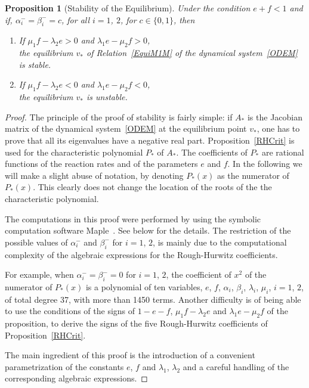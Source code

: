 \documentclass[english]{amsart}
\newtheorem{proposition}{Proposition}
\numberwithin{proposition}{section}
\begin{document}
\begin{proposition}[Stability of the Equilibrium]\label{StabM1M}
Under the condition $e{+}f {<} 1$ and if, $\alpha_i^-{=}\beta_i^-{=}c$, for all $i{=}1$, $2$, for  $c{\in}\{0,1\}$,  then
  \begin{enumerate}
  \item[(S)] If $\mu_1f{-}\lambda_2e >0$ and $\lambda_1e{-}\mu_2f>0$,\\
    the equilibrium  $v_*$ of Relation~\eqref{EquiM1M} of the dynamical system~\eqref{ODEM} is stable.
  \item[(U)] If $\mu_1f{-}\lambda_2e<0$ and $\lambda_1e{-}\mu_2f<0$,\\
    the equilibrium  $v_*$ is unstable.
  \end{enumerate}
\end{proposition}
\begin{proof}
The principle of the proof of stability is fairly simple: if $A_*$ is the Jacobian matrix of the dynamical system~\eqref{ODEM} at the equilibrium point $v_*$, one has to prove that all its eigenvalues have a negative real part. Proposition~\ref{RHCrit} is used for the characteristic  polynomial $P_*$ of $A_*$. The coefficients of $P_*$ are rational functions of the reaction rates and of the parameters $e$ and $f$. In the following we will make a slight abuse of notation, by denoting $P_*(x)$ as the numerator of $P_*(x)$. This clearly does not change  the location of the roots of the the characteristic  polynomial. 

The computations in this proof were performed by using the symbolic computation software Maple\texttrademark~\cite{Maple}.  See below for the details. The restriction of the possible values of $\alpha_i^-$ and $\beta_i^-$ for $i{=}1$, $2$, is mainly due to the computational complexity of the algebraic expressions for the Rough-Hurwitz coefficients. 

For example, when $\alpha_i^-{=}\beta_i^-{=}0$ for $i{=}1$, $2$, the coefficient of $x^2$ of the numerator of  $P_*(x)$ is a polynomial of ten variables, $e$, $f$, $\alpha_i$, $\beta_i$, $\lambda_i$, $\mu_i$, $i{=}1$, $2$,  of total degree 37, with more than 1450 terms. Another difficulty is of being able to use the conditions of the signs of $1{-}e{-}f$, $\mu_1f{-}\lambda_2e$ and $\lambda_1e{-}\mu_2f$ of the proposition, to derive the signs of the five Rough-Hurwitz coefficients of Proposition~\ref{RHCrit}.

The main ingredient of this proof is the introduction of a convenient parametrization of the constants $e$, $f$ and $\lambda_1$, $\lambda_2$ and a careful handling of the corresponding algebraic expressions. 


\end{proof}
\end{document}
